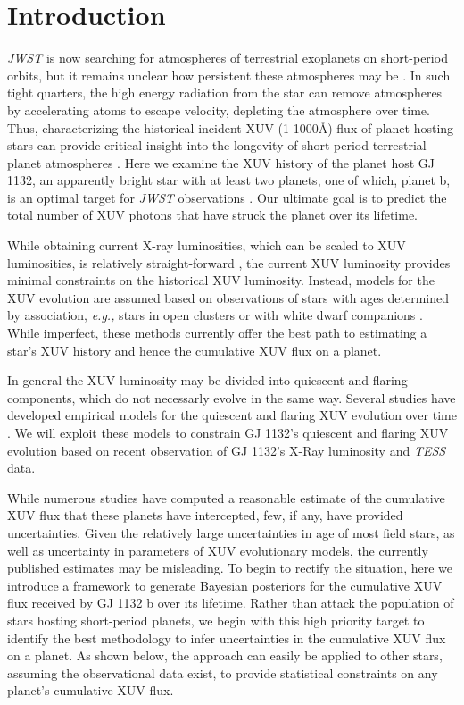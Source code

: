 \documentclass[preprint]{aastex631}
\def\eg{{\it e.g., }}
\def\tess{{\it TESS}\xspace}
\def\jwst{{\it JWST}\xspace}
\begin{document}
\section{Introduction\label{sec:intro}}

\jwst is now searching for atmospheres of terrestrial exoplanets on short-period orbits, but it remains unclear how persistent these atmospheres may be \citep[see, \eg][]{Kreidberg19,Crossfield22,Xue2024,Mansfield24,Wachiraphan25}. In such tight quarters, the high energy radiation from the star can remove atmospheres by accelerating atoms to escape velocity, depleting the atmosphere over time. Thus, characterizing the historical incident XUV (1-1000\AA) flux of planet-hosting stars can provide critical insight into the longevity of short-period terrestrial planet atmospheres \citep{ZahnleCatling17}. Here we examine the XUV history of the planet host GJ 1132, an apparently bright star with at least two planets, one of which, planet b, is an optimal target for \jwst observations \citep{BertaThompson15}. Our ultimate goal is to predict the total number of XUV photons that have struck the planet over its lifetime.

While obtaining current X-ray luminosities, which can be scaled to XUV luminosities, is relatively straight-forward \citep{MoralesCalderon2024}, the current XUV luminosity provides minimal constraints on the historical XUV luminosity. Instead, models for the XUV evolution are assumed based on observations of stars with ages determined by association, \eg stars in open clusters or with white dwarf companions \citep{Engle24}. While imperfect, these methods currently offer the best path to estimating a star's XUV history and hence the cumulative XUV flux on a planet.

In general the XUV luminosity may be divided into quiescent and flaring components, which do not necessarly evolve in the same way. Several studies have developed empirical models for the quiescent  \citep{Ribas05, Engle24,France25} and flaring XUV evolution over time \citep{Loyd18,Davenport19,Ilin19,Guenther20,Feinstein20}. We will exploit these models to constrain GJ 1132's quiescent and flaring XUV evolution based on recent observation of GJ 1132's X-Ray luminosity and \tess data.

While numerous studies have computed a reasonable estimate of the cumulative XUV flux that these planets have intercepted, few, if any, have provided uncertainties. Given the relatively large uncertainties in age of most field stars, as well as uncertainty in parameters of XUV evolutionary models, the currently published estimates may be misleading. To begin to rectify the situation, here we introduce a framework to generate Bayesian posteriors for the cumulative XUV flux received by GJ 1132 b over its lifetime. Rather than attack the population of stars hosting short-period planets, we begin with this high priority target to identify the best methodology to infer uncertainties in the cumulative XUV flux on a planet. As shown below, the approach can easily be applied to other stars, assuming the observational data exist, to provide statistical constraints on any planet's cumulative XUV flux.
\end{document}
